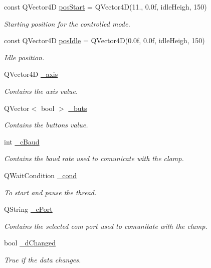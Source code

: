 \begin{DoxyCompactItemize}
const Q\+Vector4\+D \hyperlink{a00009_a67cca86496c9826987f2c543adf788be}{pos\+Start} = Q\+Vector4\+D(11., 0.\+0f, idle\+Heigh, 150)
\begin{DoxyCompactList}\small\item\em Starting position for the controlled mode. \end{DoxyCompactList}\item 
const Q\+Vector4\+D \hyperlink{a00009_a2f5ebef53b31216cb54235264ba9f8d0}{pos\+Idle} = Q\+Vector4\+D(0.\+0f, 0.\+0f, idle\+Heigh, 150)
\begin{DoxyCompactList}\small\item\em Idle position. \end{DoxyCompactList}\item 
Q\+Vector4\+D \hyperlink{a00009_a4ddc59272c23925f921e20ee630804c2}{\+\_\+axis}
\begin{DoxyCompactList}\small\item\em Contains the axis value. \end{DoxyCompactList}\item 
Q\+Vector$<$ bool $>$ \hyperlink{a00009_a6f956f7e0f2953e213ff95fb64857ab0}{\+\_\+buts}
\begin{DoxyCompactList}\small\item\em Contains the buttons value. \end{DoxyCompactList}\item 
int \hyperlink{a00009_a9fccfd415e2e55c8abef7fcc6535af30}{\+\_\+c\+Baud}
\begin{DoxyCompactList}\small\item\em Contains the baud rate used to comunicate with the clamp. \end{DoxyCompactList}\item 
Q\+Wait\+Condition \hyperlink{a00009_afcb93c09acd7fecf47d92996a297365c}{\+\_\+cond}
\begin{DoxyCompactList}\small\item\em To start and pause the thread. \end{DoxyCompactList}\item 
Q\+String \hyperlink{a00009_ab52437b31a433c427a6c050f2b1cc959}{\+\_\+c\+Port}
\begin{DoxyCompactList}\small\item\em Contains the selected com port used to comunitate with the clamp. \end{DoxyCompactList}\item 
bool \hyperlink{a00009_a2b6ccfeacbb3cc9ac5c34549b9aa3f11}{\+\_\+d\+Changed}
\begin{DoxyCompactList}\small\item\em True if the data changes. \end{DoxyCompactList}\item 

\end{DoxyCompactItemize}
